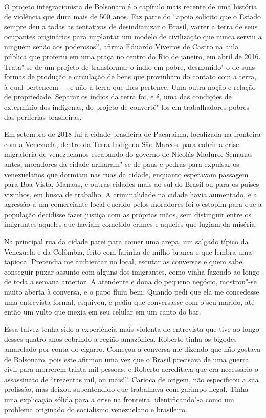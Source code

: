 O projeto integracionista de Bolsonaro é o capítulo mais recente de uma
história de violência que dura mais de 500 anos. Faz parte do ``apoio
solícito que o Estado sempre deu a todas as tentativas de desindianizar
o Brasil, varrer a terra de seus ocupantes originários para implantar um
modelo de civilização que nunca serviu a ninguém senão aos poderosos'',
afirma Eduardo Viveiros de Castro na aula pública que proferiu em uma
praça no centro do Rio de janeiro, em abril de 2016. Trata"-se de um
projeto de transformar o índio em pobre, desmunido"-o de suas formas de
produção e circulação de bens que provinham do contato com a terra, à
qual pertencem --- e não à terra que lhes pertence. Uma outra noção e
relação de propriedade. Separar os índios da terra foi, e é, uma das
condições de extermínio dos indígenas, do projeto de convertê"-los em
trabalhadores pobres das periferias brasileiras.

\asterisc

Em setembro de 2018 fui à cidade brasileira de Pacaraima, localizada na
fronteira com a Venezuela, dentro da Terra Indígena São Marcos, para
cobrir a crise migratória de venezuelanos escapando do governo de
Nicolás Maduro. Semanas antes, moradores da cidade armaram"-se de paus e
pedras para expulsar os venezuelanos que dormiam nas ruas da cidade,
enquanto esperavam passagem para Boa Vista, Manaus, e outras cidades
mais ao sul do Brasil ou para os países vizinhos, em busca de trabalho.
A criminalidade na cidade havia aumentado, e a agressão a um comerciante
local querido pelos moradores foi o estopim para que a população
decidisse fazer justiça com as próprias mãos, sem distinguir entre os
imigrantes aqueles que haviam cometido crimes e aqueles que fugiam da
miséria.

Na principal rua da cidade parei para comer uma arepa, um salgado típico
da Venezuela e da Colômbia, feito com farinha de milho branca e que
lembra uma tapioca. Pretendia me ambientar no local, escutar as
conversas e quem sabe conseguir puxar assunto com alguns dos imigrantes,
como vinha fazendo ao longo de toda a semana anterior. A atendente e
dona do pequeno negócio, mostrou"-se muito aberta à conversa, e o papo
fluiu bem. Quando pedi que ela me concedesse uma entrevista formal,
esquivou, e pediu que conversasse com o seu marido, até então um vulto
que mexia em seu celular em um canto do bar.

Essa talvez tenha sido a experiência mais violenta de entrevista que
tive ao longo desses quatro anos cobrindo a região amazônica. Roberto
tinha os bigodes amarelado por conta do cigarro. Começou a conversa me
dizendo que não gostava de Bolsonaro, pois este afirmou uma vez que o
Brasil precisava de uma guerra civil para morrerem trinta mil pessoas, e
Roberto acreditava que era necessário o assassinato de ``trezentas mil,
ou mais!''. Carioca de origem, não especificou a sua profissão, mas
deixou subentendido que trabalhava com garimpo ilegal. Tinha uma
explicação sólida para a crise na fronteira, identificando"-a como um
problema originado do socialismo venezuelano e brasileiro.

